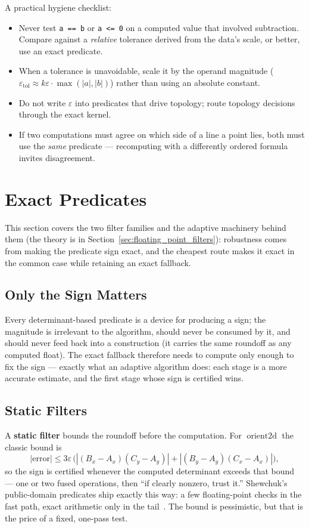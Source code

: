 A practical hygiene checklist:

\begin{itemize}
  \item Never test \texttt{a == b} or \texttt{a <= 0} on a computed value
        that involved subtraction. Compare against a \emph{relative}
        tolerance derived from the data's scale, or better, use an exact
        predicate.
  \item When a tolerance is unavoidable, scale it by the operand magnitude
        ($\varepsilon_{\mathrm{tol}} \approx k\varepsilon \cdot
        \max(|a|,|b|)$) rather than using an absolute constant.
  \item Do not write $\varepsilon$ into predicates that drive topology;
        route topology decisions through the exact kernel.
  \item If two computations must agree on which side of a line a point
        lies, both must use the \emph{same} predicate --- recomputing with a
        differently ordered formula invites disagreement.
\end{itemize}
\section{Exact Predicates}
\label{sec:app_impl_exact_predicates}
This section covers the two filter families and the adaptive machinery
behind them (the theory is in Section~\ref{sec:floating_point_filters}):
robustness comes from making the predicate sign exact, and the cheapest
route makes it exact in the common case while retaining an exact fallback.
\subsection{Only the Sign Matters}
\label{sec:appimpl_sign}
Every determinant-based predicate is a device for producing a sign; the
magnitude is irrelevant to the algorithm, should never be consumed by it,
and should never feed back into a construction (it carries the same roundoff
as any computed float). The exact fallback therefore needs to compute only
enough to fix the sign --- exactly what an adaptive
algorithm does: each stage is a more accurate estimate, and the first stage
whose sign is certified wins.
\subsection{Static Filters}
\label{sec:appimpl_static}
A \textbf{static filter} bounds the
 roundoff before the computation. For $\operatorname{orient2d}$ the classic
 bound is
\[
  |\mathrm{error}| \le 3\varepsilon\,\bigl(
  |(B_x-A_x)(C_y-A_y)| + |(B_y-A_y)(C_x-A_x)|\bigr),
\]
so the sign is certified whenever the computed determinant exceeds that
bound --- one or two fused operations, then ``if clearly nonzero, trust
it.'' Shewchuk's public-domain predicates ship exactly this way: a few
floating-point checks in the fast path, exact arithmetic only in the
tail~\cite{shewchuk1997}. The bound is pessimistic, but that is the price
of a fixed, one-pass test.

